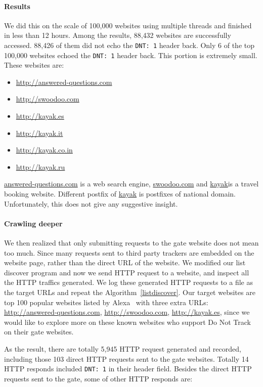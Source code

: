 \documentclass{sig-alternate}
\begin{document}
\paragraph{Results}
We did this on the scale of 100,000 websites using multiple threads and finished in less than 12 hours. Among the results, 88,432 websites are successfully accessed. 88,426 of them did not echo the \verb|DNT: 1| header back. Only 6 of the top 100,000 websites echoed the \verb|DNT: 1| header back. This portion is extremely small. These websites are:

\begin{itemize}
\item \url{http://answered-questions.com}
\item \url{http://swoodoo.com}
\item \url{http://kayak.es}
\item \url{http://kayak.it}
\item \url{http://kayak.co.in}
\item \url{http://kayak.ru}
\end{itemize}

\url{answered-questions.com} is a web search engine, \url{swoodoo.com} and \url{kayak}is a travel booking website. Different postfix of \url{kayak} is postfixes of national domain. Unfortunately, this does not give any suggestive insight. 

\paragraph{Crawling deeper}

We then realized that only submitting requests to the gate website does not mean too much. Since many requests sent to third party trackers are embedded on the website page, rather than the direct URL of the website. We modified our list discover program and now we send HTTP request to a website, and inspect all the HTTP traffics generated. We log these generated HTTP requests to a file as the target URLs and repeat the Algorithm~\ref{listdiscover}. Our target websites are top 100 popular websites listed by Alexa~\cite{alexa} with three extra URLs: \url{http://answered-questions.com}, \url{http://swoodoo.com}, \url{http://kayak.es}, since we would like to explore more on these known websites who support Do Not Track on their gate websites.

As the result, there are totally 5,945 HTTP request generated and recorded, including those 103 direct HTTP requests sent to the gate websites. Totally 14 HTTP responds included \verb|DNT: 1| in their header field. Besides the direct HTTP requests sent to the gate, some of other HTTP responds are:
\end{document}
